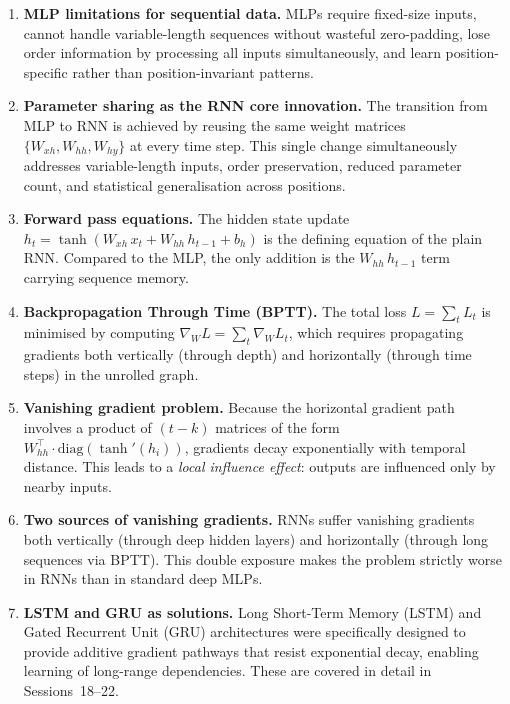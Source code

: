 \documentclass[12pt,a4paper]{article}
\newcommand{\Whh}{W_{hh}}
\newcommand{\Wxh}{W_{xh}}
\newcommand{\Why}{W_{hy}}
\begin{document}
\begin{enumerate}[label=\arabic*., leftmargin=*]

  \item \textbf{MLP limitations for sequential data.}
        MLPs require fixed-size inputs, cannot handle variable-length sequences
        without wasteful zero-padding, lose order information by processing all
        inputs simultaneously, and learn position-specific rather than
        position-invariant patterns.

  \item \textbf{Parameter sharing as the RNN core innovation.}
        The transition from MLP to RNN is achieved by reusing the same weight
        matrices $\{\Wxh, \Whh, \Why\}$ at every time step.  This single change
        simultaneously addresses variable-length inputs, order preservation,
        reduced parameter count, and statistical generalisation across positions.

  \item \textbf{Forward pass equations.}
        The hidden state update
        $h_t = \tanh(\Wxh\, x_t + \Whh\, h_{t-1} + b_h)$
        is the defining equation of the plain RNN.  Compared to the MLP,
        the only addition is the $\Whh\, h_{t-1}$ term carrying sequence memory.

  \item \textbf{Backpropagation Through Time (BPTT).}
        The total loss $L = \sum_t L_t$ is minimised by computing
        $\nabla_W L = \sum_t \nabla_W L_t$, which requires propagating gradients
        both vertically (through depth) and horizontally (through time steps)
        in the unrolled graph.

  \item \textbf{Vanishing gradient problem.}
        Because the horizontal gradient path involves a product of $(t-k)$
        matrices of the form $\Whh^{\top} \cdot \mathrm{diag}(\tanh'(h_i))$,
        gradients decay exponentially with temporal distance.  This leads to a
        \emph{local influence effect}: outputs are influenced only by nearby
        inputs.

  \item \textbf{Two sources of vanishing gradients.}
        RNNs suffer vanishing gradients both vertically (through deep hidden
        layers) and horizontally (through long sequences via BPTT).  This
        double exposure makes the problem strictly worse in RNNs than in
        standard deep MLPs.

  \item \textbf{LSTM and GRU as solutions.}
        Long Short-Term Memory (LSTM) and Gated Recurrent Unit (GRU)
        architectures were specifically designed to provide additive gradient
        pathways that resist exponential decay, enabling learning of long-range
        dependencies.  These are covered in detail in Sessions~18--22.

\end{enumerate}
\end{document}
